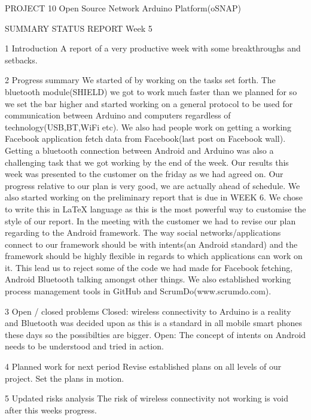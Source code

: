 PROJECT 10 Open Source Network Arduino Platform(oSNAP)

SUMMARY STATUS REPORT
Week 5

1 Introduction
A report of a very productive week with some breakthroughs and setbacks.

2 Progress summary
We started of by working on the tasks set forth. The bluetooth module(SHIELD) we got to
work much faster than we planned for so we set the bar higher and started working on a
general protocol to be used for communication between Arduino and computers regardless
of technology(USB,BT,WiFi etc). We also had people work on getting a working Facebook
application fetch data from Facebook(last post on Facebook wall). Getting a bluetooth
connection between Android and Arduino was also a challenging task that we got working by
the end of the week. Our results this week was presented to the customer on the friday as
we had agreed on. Our progress relative to our plan is very good, we are actually ahead of
schedule.
We also started working on the preliminary report that is due in WEEK 6. We chose to write this
in LaTeX language as this is the most powerful way to customise the style of our report.
In the meeting with the customer we had to revise our plan regarding to the Android framework.
The way social networks/applications connect to our framework should be with intents(an
Android standard) and the framework should be highly flexible in regards to which applications
can work on it. This lead us to reject some of the code we had made for Facebook fetching,
Android Bluetooth talking amongst other things.
We also established working process management tools in GitHub and
ScrumDo(www.scrumdo.com).

3 Open / closed problems
Closed: wireless connectivity to Arduino is a reality and Bluetooth was decided upon as this is a
standard in all mobile smart phones these days so the possibilties are bigger.
Open:
The concept of intents on Android needs to be understood and tried in action.

4 Planned work for next period
Revise established plans on all levels of our project.
Set the plans in motion.

5 Updated risks analysis
The risk of wireless connectivity not working is void after this weeks progress.